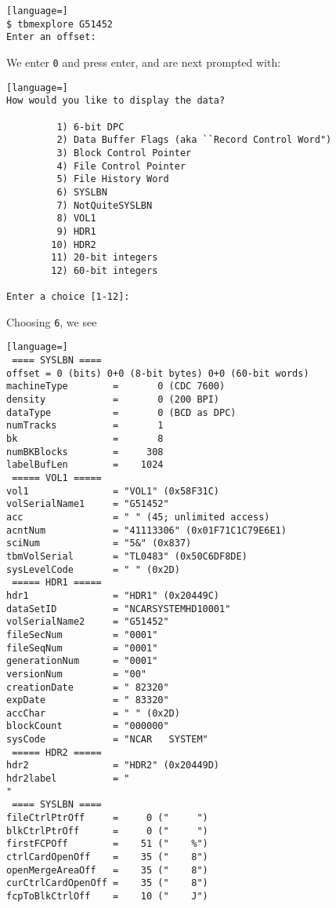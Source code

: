 \documentclass{report}
\begin{document}
\begin{lstlisting}[language=]
$ tbmexplore G51452
Enter an offset: 
\end{lstlisting}

\noindent We enter \texttt{0} and press enter, and are next prompted with:

\begin{lstlisting}[language=]
How would you like to display the data?

         1) 6-bit DPC
         2) Data Buffer Flags (aka ``Record Control Word")
         3) Block Control Pointer
         4) File Control Pointer
         5) File History Word
         6) SYSLBN
         7) NotQuiteSYSLBN
         8) VOL1
         9) HDR1
        10) HDR2
        11) 20-bit integers
        12) 60-bit integers

Enter a choice [1-12]: 
\end{lstlisting}

\noindent Choosing \texttt{6}, we see

\begin{lstlisting}[language=]
 ==== SYSLBN ====
offset = 0 (bits) 0+0 (8-bit bytes) 0+0 (60-bit words)
machineType        =       0 (CDC 7600)
density            =       0 (200 BPI)
dataType           =       0 (BCD as DPC)
numTracks          =       1
bk                 =       8
numBKBlocks        =     308
labelBufLen        =    1024
 ===== VOL1 =====
vol1               = "VOL1" (0x58F31C)
volSerialName1     = "G51452"
acc                = " " (45; unlimited access)
acntNum            = "41113306" (0x01F71C1C79E6E1)
sciNum             = "5&" (0x837)
tbmVolSerial       = "TL0483" (0x50C6DF8DE)
sysLevelCode       = " " (0x2D)
 ===== HDR1 =====
hdr1               = "HDR1" (0x20449C)
dataSetID          = "NCARSYSTEMHD10001"
volSerialName2     = "G51452"
fileSecNum         = "0001"
fileSeqNum         = "0001"
generationNum      = "0001"
versionNum         = "00"
creationDate       = " 82320"
expDate            = " 83320"
accChar            = " " (0x2D)
blockCount         = "000000"
sysCode            = "NCAR   SYSTEM"
 ===== HDR2 =====
hdr2               = "HDR2" (0x20449D)
hdr2label          = "                                                                            "
 ==== SYSLBN ====
fileCtrlPtrOff     =     0 ("     ")
blkCtrlPtrOff      =     0 ("     ")
firstFCPOff        =    51 ("    %")
ctrlCardOpenOff    =    35 ("    8")
openMergeAreaOff   =    35 ("    8")
curCtrlCardOpenOff =    35 ("    8")
fcpToBlkCtrlOff    =    10 ("    J")
\end{lstlisting}
\end{document}
